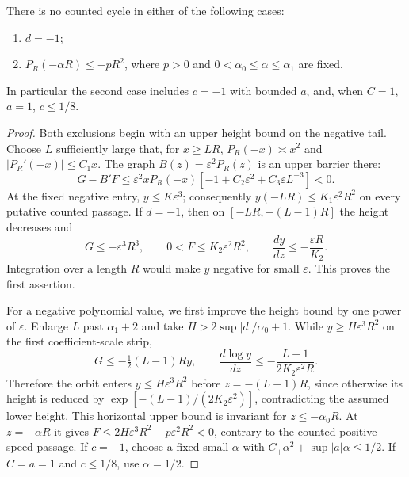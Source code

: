 \begin{samepage}
\begin{lemma}\label{lem:scaled-negative-gates}
There is no counted cycle in either of the following cases:
\begin{enumerate}
\item $d=-1$;
\item $P_R(-\alpha R)\le-pR^2$, where $p>0$ and
      $0<\alpha_0\le\alpha\le\alpha_1$ are fixed.
\end{enumerate}
In particular the second case includes $c=-1$ with bounded $a$,
and, when $C=1$, $a=1$, $c\le1/8$.
\end{lemma}
\end{samepage}
\begin{proof}
Both exclusions begin with an upper height bound on the negative tail.
Choose $L$ sufficiently large that, for $x\ge LR$,
$P_R(-x)\asymp x^2$ and $|P_R'(-x)|\le C_1x$.
The graph $B(z)=\varepsilon^2P_R(z)$ is an upper barrier there:
\[
 G-B'F\le\varepsilon^2xP_R(-x)
           [-1+C_2\varepsilon^2+C_3\varepsilon L^{-3}]<0.
\]
At the fixed negative entry, $y\le K\varepsilon^3$; consequently
$y(-LR)\le K_1\varepsilon^2R^2$ on every
putative counted passage. If $d=-1$, then on
$[-LR,-(L-1)R]$ the height decreases and
\[
 G\le-\varepsilon^3R^3,\qquad
 0<F\le K_2\varepsilon^2R^2,
 \qquad \frac{dy}{dz}\le-\frac{\varepsilon R}{K_2}.
\]
Integration over a length $R$ would make $y$ negative for small
$\varepsilon$. This proves the first assertion.

For a negative polynomial value, we first improve the height bound by
one power of $\varepsilon$. Enlarge $L$ past $\alpha_1+2$ and take
$H>2\sup|d|/\alpha_0+1$. While
$y\ge H\varepsilon^3R^2$ on the first coefficient-scale strip,
\[
 G\le-\tfrac12(L-1)Ry,\qquad
 \frac{d\log y}{dz}\le-\frac{L-1}{2K_2\varepsilon^2R}.
\]
Therefore the orbit enters $y\le H\varepsilon^3R^2$ before
$z=-(L-1)R$, since otherwise its height is reduced by
$\exp[-(L-1)/(2K_2\varepsilon^2)]$, contradicting the assumed
lower height. This horizontal upper bound is invariant for
$z\le-\alpha_0R$. At $z=-\alpha R$ it gives
$F\le2H\varepsilon^3R^2-p\varepsilon^2R^2<0$,
contrary to the counted positive-speed passage. If $c=-1$,
choose a fixed small $\alpha$ with
$C_+\alpha^2+\sup|a|\alpha\le1/2$. If $C=a=1$ and
$c\le1/8$, use $\alpha=1/2$.
\end{proof}

